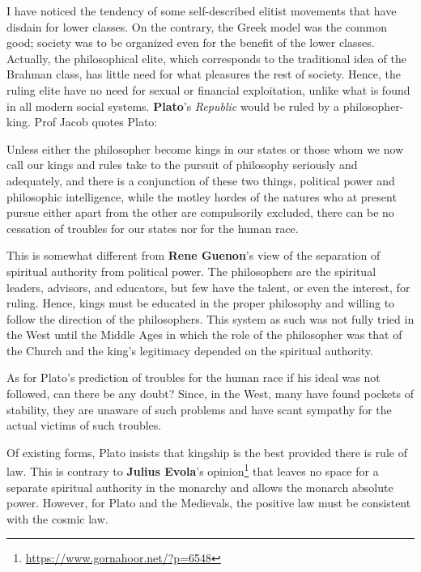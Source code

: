 I have noticed the tendency of some self-described elitist movements that have disdain for lower classes. On the contrary, the Greek model was the common good; society was to be organized even for the benefit of the lower classes. Actually, the philosophical elite, which corresponds to the traditional idea of the Brahman class, has little need for what pleasures the rest of society. Hence, the ruling elite have no need for sexual or financial exploitation, unlike what is found in all modern social systems. \textbf{Plato}'s \emph{Republic} would be ruled by a philosopher-king. Prof Jacob quotes Plato:

\begin{quotex}
Unless either the philosopher become kings in our states or those whom we now call our kings and rules take to the pursuit of philosophy seriously and adequately, and there is a conjunction of these two things, political power and philosophic intelligence, while the motley hordes of the natures who at present pursue either apart from the other are compulsorily excluded, there can be no cessation of troubles for our states nor for the human race. 

\end{quotex}
This is somewhat different from \textbf{Rene Guenon}'s view of the separation of spiritual authority from political power. The philosophers are the spiritual leaders, advisors, and educators, but few have the talent, or even the interest, for ruling. Hence, kings must be educated in the proper philosophy and willing to follow the direction of the philosophers. This system as such was not fully tried in the West until the Middle Ages in which the role of the philosopher was that of the Church and the king's legitimacy depended on the spiritual authority.

As for Plato's prediction of troubles for the human race if his ideal was not followed, can there be any doubt? Since, in the West, many have found pockets of stability, they are unaware of such problems and have scant sympathy for the actual victims of such troubles.

Of existing forms, Plato insists that kingship is the best provided there is rule of law. This is contrary to \textbf{Julius Evola}'s opinion\footnote{\url{https://www.gornahoor.net/?p=6548}} that leaves no space for a separate spiritual authority in the monarchy and allows the monarch absolute power. However, for Plato and the Medievals, the positive law must be consistent with the cosmic law.

